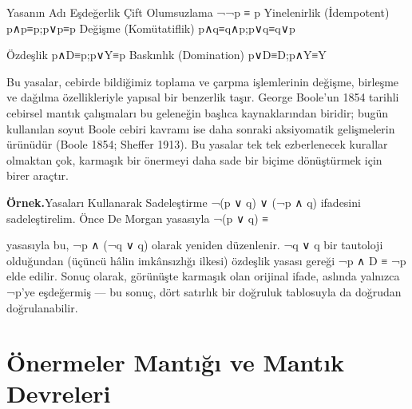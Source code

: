 Yasanın Adı                          Eşdeğerlik Çift Olumsuzlama                     ¬¬p ≡ p Yinelenirlik (İdempotent)            p∧p≡p;p∨p≡p Değişme (Komütatiflik)               p∧q≡q∧p;p∨q≡q∨p

Özdeşlik                             p∧D≡p;p∨Y≡p Baskınlık (Domination)               p∨D≡D;p∧Y≡Y

Bu yasalar, cebirde bildiğimiz toplama ve çarpma işlemlerinin değişme, birleşme ve dağılma özellikleriyle yapısal bir benzerlik taşır. George Boole’un 1854 tarihli cebirsel mantık çalışmaları bu geleneğin başlıca kaynaklarından biridir; bugün kullanılan soyut Boole cebiri kavramı ise daha sonraki aksiyomatik gelişmelerin ürünüdür (Boole 1854; Sheffer 1913). Bu yasalar tek tek ezberlenecek kurallar olmaktan çok, karmaşık bir önermeyi daha sade bir biçime dönüştürmek için birer araçtır.

\begin{tcolorbox}[bookbox,colback=cEx]\textbf{\textsf{\textcolor{cAcc}{Örnek.}}}\quad Yasaları Kullanarak Sadeleştirme ¬(p ∨ q) ∨ (¬p ∧ q) ifadesini sadeleştirelim. Önce De Morgan yasasıyla ¬(p ∨ q) ≡\end{tcolorbox}

yasasıyla bu, ¬p ∧ (¬q ∨ q) olarak yeniden düzenlenir. ¬q ∨ q bir tautoloji olduğundan (üçüncü hâlin imkânsızlığı ilkesi) özdeşlik yasası gereği ¬p ∧ D ≡ ¬p elde edilir. Sonuç olarak, görünüşte karmaşık olan orijinal ifade, aslında yalnızca ¬p’ye eşdeğermiş — bu sonuç, dört satırlık bir doğruluk tablosuyla da doğrudan doğrulanabilir.

\section{Önermeler Mantığı ve Mantık Devreleri}\label{sec:devreler}

